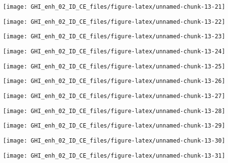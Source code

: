 \documentclass[
  10pt,
  a4paper,oneside]{article}
\begin{document}
\begin{center}\texttt{[image: GHI\_enh\_02\_ID\_CE\_files/figure-latex/unnamed-chunk-13-21]} \end{center}

\begin{center}\texttt{[image: GHI\_enh\_02\_ID\_CE\_files/figure-latex/unnamed-chunk-13-22]} \end{center}

\begin{center}\texttt{[image: GHI\_enh\_02\_ID\_CE\_files/figure-latex/unnamed-chunk-13-23]} \end{center}

\begin{center}\texttt{[image: GHI\_enh\_02\_ID\_CE\_files/figure-latex/unnamed-chunk-13-24]} \end{center}

\begin{center}\texttt{[image: GHI\_enh\_02\_ID\_CE\_files/figure-latex/unnamed-chunk-13-25]} \end{center}

\begin{center}\texttt{[image: GHI\_enh\_02\_ID\_CE\_files/figure-latex/unnamed-chunk-13-26]} \end{center}

\begin{center}\texttt{[image: GHI\_enh\_02\_ID\_CE\_files/figure-latex/unnamed-chunk-13-27]} \end{center}

\begin{center}\texttt{[image: GHI\_enh\_02\_ID\_CE\_files/figure-latex/unnamed-chunk-13-28]} \end{center}

\begin{center}\texttt{[image: GHI\_enh\_02\_ID\_CE\_files/figure-latex/unnamed-chunk-13-29]} \end{center}

\begin{center}\texttt{[image: GHI\_enh\_02\_ID\_CE\_files/figure-latex/unnamed-chunk-13-30]} \end{center}

\begin{center}\texttt{[image: GHI\_enh\_02\_ID\_CE\_files/figure-latex/unnamed-chunk-13-31]} \end{center}
\end{document}
